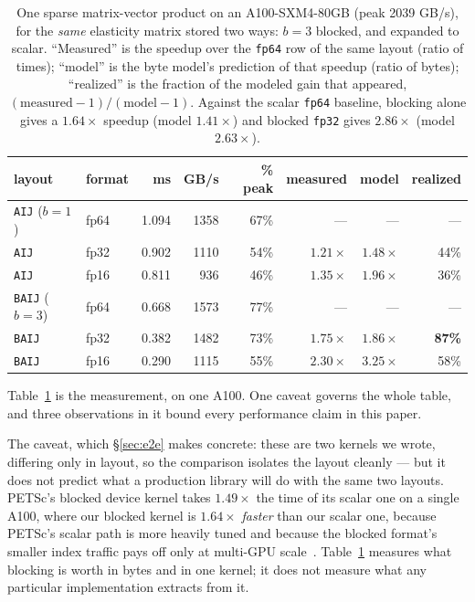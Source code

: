\documentclass[11pt]{article}
\begin{document}
\begin{table}[t]
\centering\small
\begin{tabular}{@{}llrrrrrr@{}}
\toprule
layout & format & ms & GB/s & \% peak & measured & model & realized\\
\midrule
\texttt{AIJ} ($b{=}1$)  & fp64 & 1.094 & 1358 & 67\% & --- & --- & ---\\
\texttt{AIJ}  & fp32 & 0.902 & 1110 & 54\% & $1.21\times$ & $1.48\times$ & 44\%\\
\texttt{AIJ}  & fp16 & 0.811 &  936 & 46\% & $1.35\times$ & $1.96\times$ & 36\%\\
\texttt{BAIJ} ($b{=}3$) & fp64 & 0.668 & 1573 & 77\% & --- & --- & ---\\
\texttt{BAIJ} & fp32 & 0.382 & 1482 & 73\% & $\mathbf{1.75\times}$ & $1.86\times$ & \textbf{87\%}\\
\texttt{BAIJ} & fp16 & 0.290 & 1115 & 55\% & $2.30\times$ & $3.25\times$ & 58\%\\
\bottomrule
\end{tabular}
\caption{One sparse matrix-vector product on an A100-SXM4-80GB (peak 2039 GB/s),
for the \emph{same} elasticity matrix stored two ways: $b=3$ blocked, and
expanded to scalar. ``Measured'' is the speedup over the \texttt{fp64} row of
the same layout (ratio of times); ``model'' is the byte model's prediction of
that speedup (ratio of bytes); ``realized'' is the fraction of the modeled gain
that appeared, $(\text{measured}-1)/(\text{model}-1)$. Against the scalar
\texttt{fp64} baseline, blocking alone gives a $1.64\times$ speedup (model
$1.41\times$) and blocked \texttt{fp32} gives $2.86\times$ (model $2.63\times$).}
\label{tab:spmv}
\end{table}

Table~\ref{tab:spmv} is the measurement, on one A100. One caveat governs the
whole table, and three observations in it bound every performance claim in this
paper.

The caveat, which \S\ref{sec:e2e} makes concrete: these
are two kernels we wrote, differing only in layout, so the comparison isolates
the layout cleanly --- but it does not predict what a production library will do
with the same two layouts. PETSc's blocked device kernel takes $1.49\times$
the time of its scalar one on a single A100, where our blocked kernel is
$1.64\times$ \emph{faster} than our scalar one, because PETSc's scalar path is
more heavily tuned and because the blocked format's smaller index traffic pays
off only at multi-GPU scale~\cite{baijkokkos}. Table~\ref{tab:spmv} measures
what blocking
is worth in bytes and in one kernel; it does not measure what any particular
implementation extracts from it.
\end{document}
